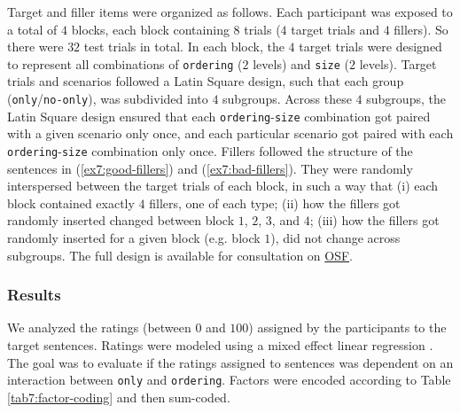 Target and filler items were organized as follows. Each participant was exposed to a total of $4$ blocks, each block containing $8$ trials ($4$ target trials and $4$ fillers). So there were $32$ test trials in total. In each block, the $4$ target trials were designed to represent all combinations of \texttt{ordering} ($2$ levels) and \texttt{size} ($2$ levels). Target trials and scenarios followed a Latin Square design, such that each group (\texttt{only}/\texttt{no-only}), was subdivided into $4$ subgroups. Across these $4$ subgroups, the Latin Square design ensured that each \texttt{ordering}-\texttt{size} combination got paired with a given scenario only once, and each particular scenario got paired with each \texttt{ordering}-\texttt{size} combination only once. Fillers followed the structure of the sentences in (\ref{ex7:good-fillers}) and (\ref{ex7:bad-fillers}). They were randomly interspersed between the target trials of each block, in such a way that (i) each block contained exactly $4$ fillers, one of each type; (ii) how the fillers got randomly inserted changed between block $1$, $2$, $3$, and $4$; (iii) how the fillers got randomly inserted for a given block (e.g. block $1$), did not change across subgroups. The full design is available for consultation on \href{https://osf.io/fn9p4}{OSF}.




\subsubsection{Results}
We analyzed the ratings (between $0$ and $100$) assigned by the participants to the target sentences. Ratings were modeled using a mixed effect linear regression \parencite{Bates2015,Kuznetsova2017}. The goal was to evaluate if the ratings assigned to sentences was dependent on an interaction between \texttt{only} and \texttt{ordering}. Factors were encoded according to Table \ref{tab7:factor-coding} and then sum-coded. 

